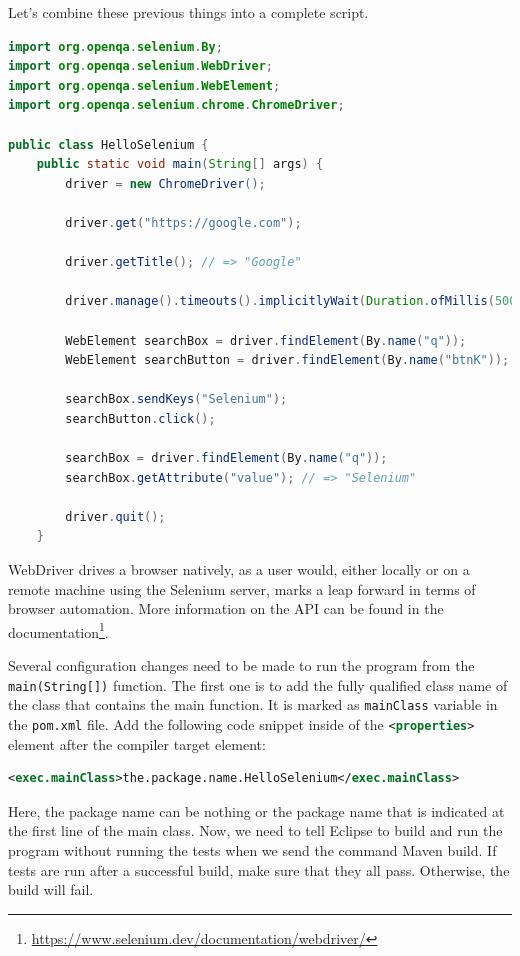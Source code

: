 Let’s combine these previous things into a complete script.
\begin{lstlisting}[language=java,caption={The complete example to open Google and search for Selenium.}]
import org.openqa.selenium.By;
import org.openqa.selenium.WebDriver;
import org.openqa.selenium.WebElement;
import org.openqa.selenium.chrome.ChromeDriver;

public class HelloSelenium {
    public static void main(String[] args) {
        driver = new ChromeDriver();

        driver.get("https://google.com");
        
        driver.getTitle(); // => "Google"

        driver.manage().timeouts().implicitlyWait(Duration.ofMillis(500));
        
        WebElement searchBox = driver.findElement(By.name("q"));
        WebElement searchButton = driver.findElement(By.name("btnK"));
        
        searchBox.sendKeys("Selenium");
        searchButton.click();
        
        searchBox = driver.findElement(By.name("q"));
        searchBox.getAttribute("value"); // => "Selenium"
        
        driver.quit();
    }
\end{lstlisting}

WebDriver drives a browser natively, as a user would, either locally or on a remote machine using the Selenium server, marks a leap forward in terms of browser automation. More information on the API can be found in the documentation\footnote{\url{https://www.selenium.dev/documentation/webdriver/}}.

Several configuration changes need to be made to run the program from the \lstinline!main(String[])! function. The first one is to add the fully qualified class name of the class that contains the main function. It is marked as \lstinline!mainClass! variable in the \lstinline!pom.xml! file. Add the following code snippet inside of the \lstinline[language=XML]!<properties>! element after the compiler target element:
\begin{lstlisting}[language=XML]
<exec.mainClass>the.package.name.HelloSelenium</exec.mainClass>
\end{lstlisting}

Here, the package name can be nothing or the package name that is indicated at the first line of the main class. Now, we need to tell Eclipse to build and run the program without running the tests when we send the command Maven build. If tests are run after a successful build, make sure that they all pass. Otherwise, the build will fail.

